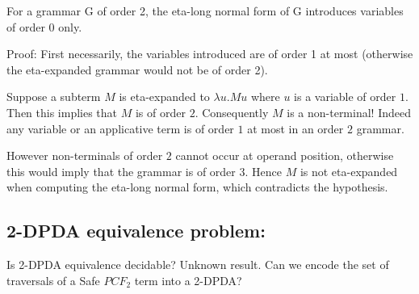 \documentclass{article}
\begin{document}
For a grammar G of order 2, the eta-long normal form of G introduces variables
of order 0 only.

Proof: First necessarily, the variables introduced are of order 1 at most
(otherwise the eta-expanded grammar would not be of order 2).

Suppose a subterm $M$ is eta-expanded to $\lambda u . M u$ where $u$ is a variable
of order $1$. Then this implies that $M$ is of order $2$. Consequently $M$ is a non-terminal!
Indeed any variable or an applicative term is of order $1$ at most in an order $2$ grammar.

However non-terminals of order $2$ cannot occur at operand position, otherwise this would imply that
the grammar is of order $3$. Hence $M$ is not eta-expanded when computing the eta-long normal form, which contradicts the hypothesis.


\subsection{2-DPDA equivalence problem:}

Is 2-DPDA equivalence decidable? Unknown result.
Can we encode the set of traversals of a Safe $PCF_2$ term into a 2-DPDA?







\end{document}
